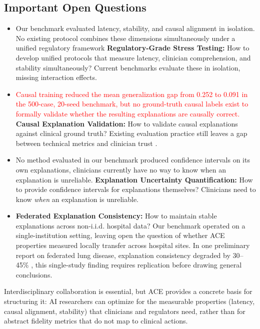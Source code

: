 \documentclass[pdflatex,sn-mathphys-num]{sn-jnl}%
\theoremstyle{thmstyleone}%
\theoremstyle{thmstyletwo}%
\theoremstyle{thmstylethree}%
\begin{document}
\begin{itemize}
\subsection{Important Open Questions}

\begin{itemize}
    \item Our benchmark evaluated latency, stability, and causal alignment in isolation. No existing protocol combines these dimensions simultaneously under a unified regulatory framework
    \textbf{Regulatory-Grade Stress Testing:} How to develop unified protocols that measure latency, clinician comprehension, and stability simultaneously? Current benchmarks evaluate these in isolation, missing interaction effects.
    \item \textcolor{red}{Causal training reduced the mean generalization gap from 0.252 to 0.091 in the 500-case, 20-seed benchmark, but no ground-truth causal labels exist to formally validate whether the resulting explanations are causally correct.}
    \textbf{Causal Explanation Validation:} How to validate causal explanations against clinical ground truth? Existing evaluation practice still leaves a gap between technical metrics and clinician trust \cite{gambetti2025surveyhumancenteredevaluationexplainable}.
    \item No method evaluated in our benchmark produced confidence intervals on its own explanations, clinicians currently have no way to know when an explanation is unreliable.
    \textbf{Explanation Uncertainty Quantification:} How to provide confidence intervals for explanations themselves? Clinicians need to know \textit{when} an explanation is unreliable.
    
    \item  \textbf{Federated Explanation Consistency:} 
    How to maintain stable explanations across non-i.i.d. hospital data? Our benchmark operated on a single-institution setting, leaving open the question of whether ACE properties measured locally transfer across hospital sites. In one preliminary report on federated lung disease, explanation consistency degraded by 30–45\% \cite{Durga2025flem}, this single-study finding requires replication before drawing general conclusions.
\end{itemize}
Interdisciplinary collaboration is essential, but ACE provides a concrete basis for structuring it: AI researchers can optimize for the measurable properties (latency, causal alignment, stability) that clinicians and regulators need, rather than for abstract fidelity metrics that do not map to clinical actions.


\end{itemize}
\end{document}
